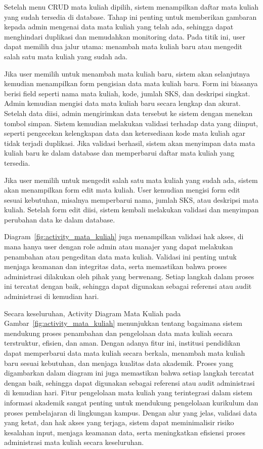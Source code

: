\documentclass[a4paper,oneside,11pt]{book}
\begin{document}
Setelah menu CRUD mata kuliah dipilih, sistem menampilkan daftar mata kuliah yang sudah tersedia di database. Tahap ini penting untuk memberikan gambaran kepada admin mengenai data mata kuliah yang telah ada, sehingga dapat menghindari duplikasi dan memudahkan monitoring data. Pada titik ini, user dapat memilih dua jalur utama: menambah mata kuliah baru atau mengedit salah satu mata kuliah yang sudah ada.

Jika user memilih untuk menambah mata kuliah baru, sistem akan selanjutnya kemudian menampilkan form pengisian data mata kuliah baru. Form ini biasanya berisi field seperti nama mata kuliah, kode, jumlah SKS, dan deskripsi singkat. Admin kemudian mengisi data mata kuliah baru secara lengkap dan akurat. Setelah data diisi, admin mengirimkan data tersebut ke sistem dengan menekan tombol simpan. Sistem kemudian melakukan validasi terhadap data yang diinput, seperti pengecekan kelengkapan data dan ketersediaan kode mata kuliah agar tidak terjadi duplikasi. Jika validasi berhasil, sistem akan menyimpan data mata kuliah baru ke dalam database dan memperbarui daftar mata kuliah yang tersedia.

Jika user memilih untuk mengedit salah satu mata kuliah yang sudah ada, sistem akan menampilkan form edit mata kuliah. User kemudian mengisi form edit sesuai kebutuhan, misalnya memperbarui nama, jumlah SKS, atau deskripsi mata kuliah. Setelah form edit diisi, sistem kembali melakukan validasi dan menyimpan perubahan data ke dalam database.

Diagram~\ref{fig:activity_mata_kuliah} juga menampilkan validasi hak akses, di mana hanya user dengan role admin atau manajer yang dapat melakukan penambahan atau pengeditan data mata kuliah. Validasi ini penting untuk menjaga keamanan dan integritas data, serta memastikan bahwa proses administrasi dilakukan oleh pihak yang berwenang. Setiap langkah dalam proses ini tercatat dengan baik, sehingga dapat digunakan sebagai referensi atau audit administrasi di kemudian hari.

Secara keseluruhan, Activity Diagram Mata Kuliah pada Gambar~\ref{fig:activity_mata_kuliah} menunjukkan tentang bagaimana sistem mendukung proses penambahan dan pengelolaan data mata kuliah secara terstruktur, efisien, dan aman. Dengan adanya fitur ini, institusi pendidikan dapat memperbarui data mata kuliah secara berkala, menambah mata kuliah baru sesuai kebutuhan, dan menjaga kualitas data akademik. Proses yang digambarkan dalam diagram ini juga memastikan bahwa setiap langkah tercatat dengan baik, sehingga dapat digunakan sebagai referensi atau audit administrasi di kemudian hari. Fitur pengelolaan mata kuliah yang terintegrasi dalam sistem informasi akademik sangat penting untuk mendukung pengelolaan kurikulum dan proses pembelajaran di lingkungan kampus. Dengan alur yang jelas, validasi data yang ketat, dan hak akses yang terjaga, sistem dapat meminimalisir risiko kesalahan input, menjaga keamanan data, serta meningkatkan efisiensi proses administrasi mata kuliah secara keseluruhan.
\end{document}
